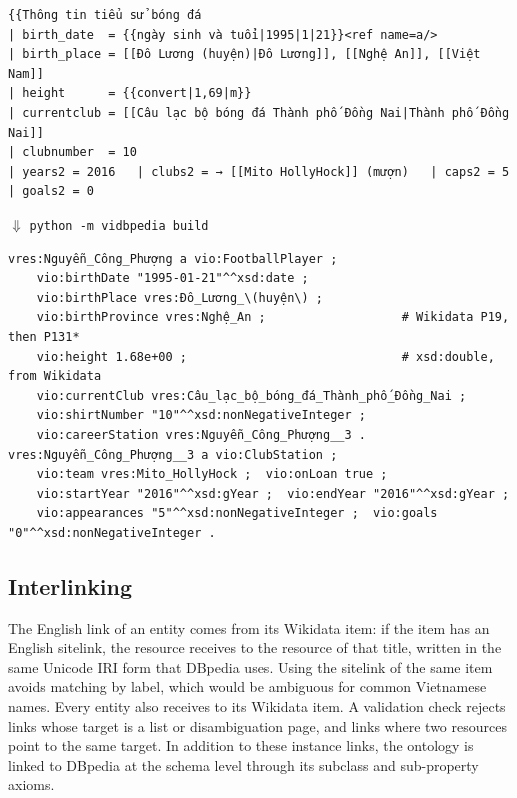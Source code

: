 \begin{listing}[t]
\begin{Verbatim}
{{Thông tin tiểu sử bóng đá
| birth_date  = {{ngày sinh và tuổi|1995|1|21}}<ref name=a/>
| birth_place = [[Đô Lương (huyện)|Đô Lương]], [[Nghệ An]], [[Việt Nam]]
| height      = {{convert|1,69|m}}
| currentclub = [[Câu lạc bộ bóng đá Thành phố Đồng Nai|Thành phố Đồng Nai]]
| clubnumber  = 10
| years2 = 2016   | clubs2 = → [[Mito HollyHock]] (mượn)   | caps2 = 5   | goals2 = 0
\end{Verbatim}
\vspace{-0.4em}
\begin{center}\footnotesize $\Downarrow$ \quad \texttt{python -m vidbpedia build}\end{center}
\vspace{-0.6em}
\begin{Verbatim}
vres:Nguyễn_Công_Phượng a vio:FootballPlayer ;
    vio:birthDate "1995-01-21"^^xsd:date ;
    vio:birthPlace vres:Đô_Lương_\(huyện\) ;
    vio:birthProvince vres:Nghệ_An ;                   # Wikidata P19, then P131*
    vio:height 1.68e+00 ;                              # xsd:double, from Wikidata
    vio:currentClub vres:Câu_lạc_bộ_bóng_đá_Thành_phố_Đồng_Nai ;
    vio:shirtNumber "10"^^xsd:nonNegativeInteger ;
    vio:careerStation vres:Nguyễn_Công_Phượng__3 .
vres:Nguyễn_Công_Phượng__3 a vio:ClubStation ;
    vio:team vres:Mito_HollyHock ;  vio:onLoan true ;
    vio:startYear "2016"^^xsd:gYear ;  vio:endYear "2016"^^xsd:gYear ;
    vio:appearances "5"^^xsd:nonNegativeInteger ;  vio:goals "0"^^xsd:nonNegativeInteger .
\end{Verbatim}
\caption{From three to four stars: part of the infobox of Nguyễn Công Phượng
(top, wikitext) and the triples the build produces for it (bottom, Turtle,
excerpt).}
\label{lst:fourstar}
\end{listing}

\subsection{Interlinking}
\label{sec:interlinking}

The English link of an entity comes from its Wikidata item: if the item has an
English sitelink, the resource receives  to the 
resource of that title, written in the same Unicode IRI form that DBpedia
uses. Using the sitelink of the same item avoids matching by label, which
would be ambiguous for common Vietnamese names. Every entity also receives
 to its Wikidata item. A validation check rejects links whose
target is a list or disambiguation page, and links where two resources point
to the same target. In addition to these instance links, the ontology is linked
to DBpedia at the schema level through its subclass and sub-property axioms.

